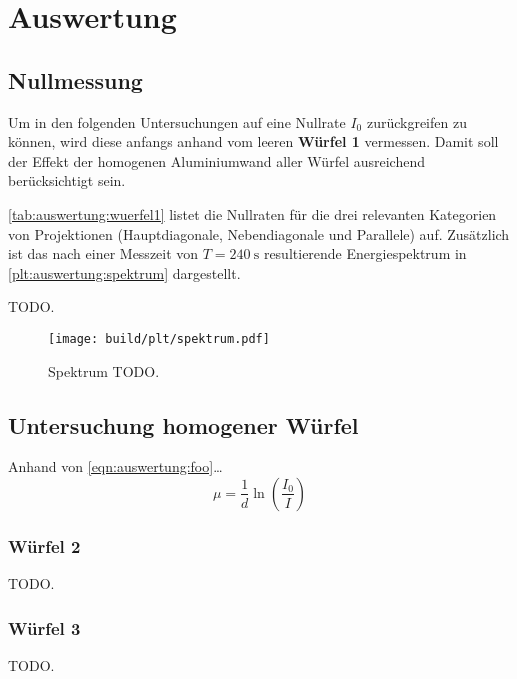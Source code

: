 \section{Auswertung}
\label{sec:auswertung}

\subsection{Nullmessung}
Um in den folgenden Untersuchungen auf eine Nullrate $I_0$ zurückgreifen zu können,
wird diese anfangs anhand vom leeren \textbf{Würfel 1} vermessen.
Damit soll der Effekt der homogenen Aluminiumwand aller Würfel ausreichend berücksichtigt sein.

\autoref{tab:auswertung:wuerfel1} listet die Nullraten für die drei relevanten Kategorien von Projektionen
(Hauptdiagonale, Nebendiagonale und Parallele)
auf.
Zusätzlich ist das nach einer Messzeit von $T = \SI{240}{\second}$ resultierende Energiespektrum in \autoref{plt:auswertung:spektrum} dargestellt.

\begin{table}[H]
    \centering
    \caption{TODO.}
    \label{tab:auswertung:wuerfel1}
\end{table}

\begin{figure}
    \centering
    \texttt{[image: build/plt/spektrum.pdf]}
    \caption{Spektrum TODO.}
    \label{plt:auswertung:spektrum}
\end{figure}


\subsection{Untersuchung homogener Würfel}
Anhand von \autoref{eqn:auswertung:foo}…
\begin{equation}
    \mu = \frac{1}{d} \ln \left( \frac{I_0}{I} \right)
    \label{eqn:auswertung:foo}
\end{equation}


\subsubsection{\textbf{Würfel 2}}
\begin{table}[H]
    \centering
    \caption{TODO.}
    \label{tab:auswertung:wuerfel2}
\end{table}

\subsubsection{\textbf{Würfel 3}}
\begin{table}[H]
    \centering
    \caption{TODO.}
    \label{tab:auswertung:wuerfel3}
\end{table}


